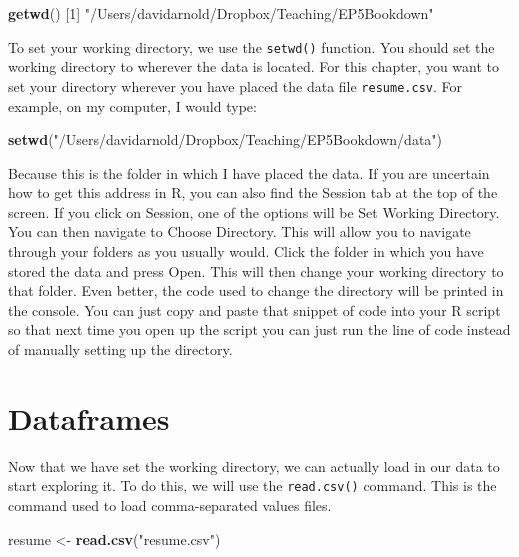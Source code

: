 \documentclass[
]{book}
\newenvironment{Shaded}{\begin{snugshade}}{\end{snugshade}}
\newcommand{\DecValTok}[1]{\textcolor[rgb]{0.00,0.00,0.81}{#1}}
\newcommand{\FunctionTok}[1]{\textcolor[rgb]{0.13,0.29,0.53}{\textbf{#1}}}
\newcommand{\NormalTok}[1]{#1}
\newcommand{\OtherTok}[1]{\textcolor[rgb]{0.56,0.35,0.01}{#1}}
\newcommand{\StringTok}[1]{\textcolor[rgb]{0.31,0.60,0.02}{#1}}
\begin{document}
\begin{Shaded}
\begin{Highlighting}[]
\FunctionTok{getwd}\NormalTok{()}
\NormalTok{[}\DecValTok{1}\NormalTok{] }\StringTok{"/Users/davidarnold/Dropbox/Teaching/EP5Bookdown"}
\end{Highlighting}
\end{Shaded}

To set your working directory, we use the \texttt{setwd()} function. You should set the working directory to wherever the data is located. For this chapter, you want to set your directory wherever you have placed the data file \texttt{resume.csv}. For example, on my computer, I would type:

\begin{Shaded}
\begin{Highlighting}[]
\FunctionTok{setwd}\NormalTok{(}\StringTok{"/Users/davidarnold/Dropbox/Teaching/EP5Bookdown/data"}\NormalTok{) }
\end{Highlighting}
\end{Shaded}

Because this is the folder in which I have placed the data. If you are uncertain how to get this address in R, you can also find the Session tab at the top of the screen. If you click on Session, one of the options will be Set Working Directory. You can then navigate to Choose Directory. This will allow you to navigate through your folders as you usually would. Click the folder in which you have stored the data and press Open. This will then change your working directory to that folder. Even better, the code used to change the directory will be printed in the console. You can just copy and paste that snippet of code into your R script so that next time you open up the script you can just run the line of code instead of manually setting up the directory.

\section{Dataframes}\label{dataframes}

Now that we have set the working directory, we can actually load in our data to start exploring it. To do this, we will use the \texttt{read.csv()} command. This is the command used to load comma-separated values files.

\begin{Shaded}
\begin{Highlighting}[]
\NormalTok{resume }\OtherTok{\textless{}{-}} \FunctionTok{read.csv}\NormalTok{(}\StringTok{"resume.csv"}\NormalTok{)}
\end{Highlighting}
\end{Shaded}
\end{document}
